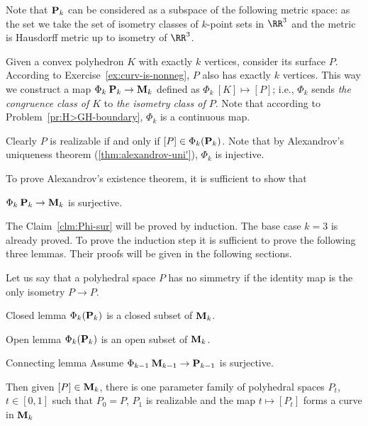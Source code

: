 Note that $\text{\bf P}_k$ can be considered as a subspace of the following metric space:
as the set we take the set of isometry classes of $k$-point sets in $\RR^3$ 
and the metric is  Hausdorff metric up to isometry of $\RR^3$.


Given a convex polyhedron $K$ with exactly $k$ vertices, consider its surface $P$.
According to Exercise~\ref{ex:curv-is-nonneg}, $P$ also has exactly $k$ vertices.
This way we construct a map $\Phi_k\:\text{\bf P}_k\to\text{\bf M}_k$
defined as $\Phi_k\:[K]\mapsto [P]$; i.e.,
$\Phi_k$ sends \textit{the congruence class of $K$} to \textit{the isometry class of $P$}.
Note that according to Problem~\ref{pr:H>GH-boundary}, $\Phi_k$ is a continuous map.

Clearly $P$ is realizable if and only if $[P]\in\Phi_k(\text{\bf P}_k)$.
Note that by Alexandrov's uniqueness theorem (\ref{thm:alexandrov-uni'}), $\Phi_k$ is injective.

To prove Alexandrov's existence theorem, 
it is sufficient to show that 
\begin{clm}{}\label{clm:Phi-sur}
$\Phi_k\:\text{\bf P}_k\to \text{\bf M}_k$ is surjective.
\end{clm}

 The Claim~\ref{clm:Phi-sur} will be proved by induction.
The base case $k=3$ is already proved. 
To prove the induction step it is sufficient to prove the following three lemmas.
Their proofs will be given in the following sections.

Let us say that a polyhedral space $P$ has no simmetry if the identity map is the only isometry $P\to P$. 

\begin{thm}{Closed lemma}\label{lem:Phi(P)-closed}
$\Phi_k(\text{\bf P}_k)$ is a closed subset of $\text{\bf M}_k$.
\end{thm}

\begin{thm}{Open lemma}\label{lem:Phi(P)-open}
$\Phi_k(\text{\bf P}_k)$ is an open subset of $\text{\bf M}_k$.
\end{thm}


\begin{thm}{Connecting lemma}\label{lem:Phi(P)-connect}
Assume $\Phi_{k-1}\:\text{\bf M}_{k-1}\to \text{\bf P}_{k-1}$ is surjective.

Then given $[P]\in \text{\bf M}_{k}$,
there is one parameter family of polyhedral spaces $P_t$, $t\in [0,1]$
such that
$P_0=P$, $P_1$ is realizable and the map 
$t\mapsto [P_t]$ forms a curve in $\text{\bf M}_{k}$
\end{thm}

